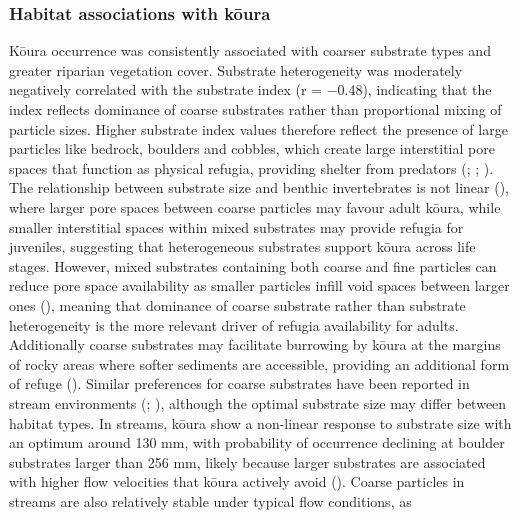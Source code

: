 \documentclass[
  letterpaper,
  DIV=11,
  numbers=noendperiod]{scrartcl}
\begin{document}
\subsubsection{Habitat associations with
kōura}\label{habitat-associations-with-kux14dura}

Kōura occurrence was consistently associated with coarser substrate
types and greater riparian vegetation cover. Substrate heterogeneity was
moderately negatively correlated with the substrate index (r = −0.48),
indicating that the index reflects dominance of coarse substrates rather
than proportional mixing of particle sizes. Higher substrate index
values therefore reflect the presence of large particles like bedrock,
boulders and cobbles, which create large interstitial pore spaces that
function as physical refugia, providing shelter from predators
(;
;
). The
relationship between substrate size and benthic invertebrates is not
linear (), where larger
pore spaces between coarse particles may favour adult kōura, while
smaller interstitial spaces within mixed substrates may provide refugia
for juveniles, suggesting that heterogeneous substrates support kōura
across life stages. However, mixed substrates containing both coarse and
fine particles can reduce pore space availability as smaller particles
infill void spaces between larger ones
(),
meaning that dominance of coarse substrate rather than substrate
heterogeneity is the more relevant driver of refugia availability for
adults. Additionally coarse substrates may facilitate burrowing by kōura
at the margins of rocky areas where softer sediments are accessible,
providing an additional form of refuge (). Similar preferences for coarse substrates have been
reported in stream environments (; ), although
the optimal substrate size may differ between habitat types. In streams,
kōura show a non-linear response to substrate size with an optimum
around 130 mm, with probability of occurrence declining at boulder
substrates larger than 256 mm, likely because larger substrates are
associated with higher flow velocities that kōura actively avoid
(). Coarse particles in
streams are also relatively stable under typical flow conditions, as
\end{document}
